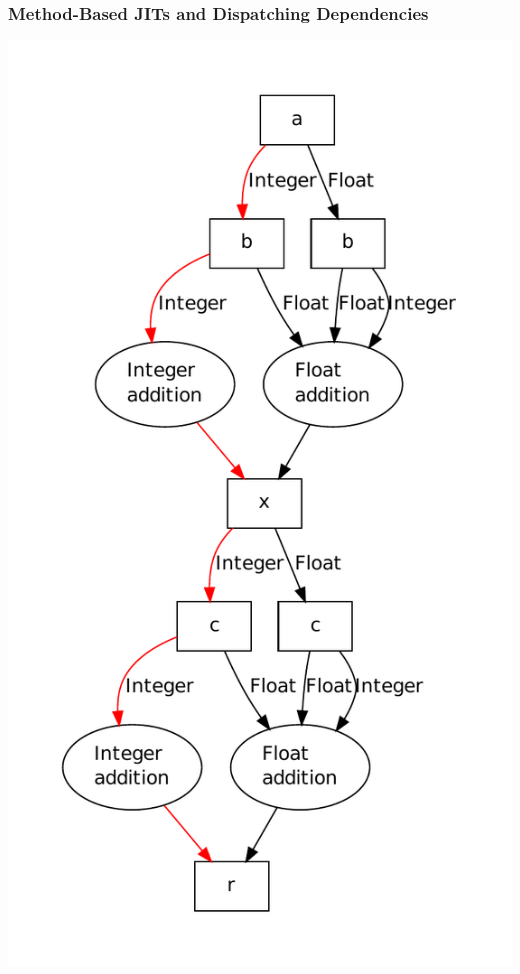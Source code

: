 \documentclass[utf8x]{beamer}
\begin{document}
\begin{frame}
  \frametitle{Method-Based JITs and Dispatching Dependencies}
  \includegraphics[scale=0.39]{figures/add2.pdf}
\end{frame}
\end{document}
